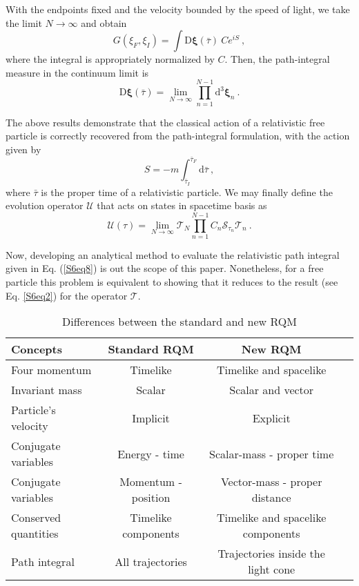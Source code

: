 \documentclass[12pt]{iopart}
\begin{document}
With the endpoints fixed and the velocity bounded by the speed of light, we take the limit 
$N\to\infty$ and obtain
%
    \begin{equation}
        G(\xi_F,\xi_I)=\int\mathrm{D}\boldsymbol{\xi}(\bar{\tau})\ Ce^{i S}\ ,
        \label{S6eq8}
    \end{equation}
%
where the integral is appropriately normalized by $C$.  Then, the path-integral measure 
in the continuum limit is
%
    \begin{equation}
        \mathrm{D}\boldsymbol{\xi}(\bar{\tau})=\lim_{N\to\infty}\prod_{n=1}^{N-1}
        \mathrm{d}^3\boldsymbol{\xi}_{n}\ .
        \label{S6eq9}
    \end{equation}
%

The above results demonstrate that the classical action of a relativistic free particle is correctly 
recovered from the path-integral formulation, with the action given by 
%
    \begin{equation}
        S=-m\int_{\bar{\tau}_I}^{\bar{\tau}_F}\mathrm{d}\bar{\tau}\ ,
        \label{S6eq10}
    \end{equation}
%
where $\bar{\tau}$ is the proper time of a relativistic particle.  We may finally define the 
evolution operator $\mathcal{U}$ that acts on states in spacetime basis as
%
    \begin{equation}
        \mathcal{U}(\tau)=\lim_{N\to\infty}\mathcal{T}_{N}\prod_{n=1}^{N-1}C_n\mathcal{S}_{\tau_n}
        \mathcal{T}_{n}\ .
        \label{S6eq11}
    \end{equation}
%

Now, developing an analytical method to evaluate the relativistic path integral given in Eq. 
(\ref{S6eq8}) is out the scope of this paper.  Nonetheless, for a free particle this problem 
is equivalent to showing that it reduces to the result (see Eq. \ref{S6eq2}) for the operator 
$\mathcal{T}$.
%


%
\begin{table}
\caption{Differences between the standard and new RQM}\label{tab1}
\centering
\begin{tabular}{| l | c | c | c }
\hline
\textbf{Concepts} & \textbf{Standard RQM}  & \textbf{New RQM}\\
\hline
Four momentum & Timelike & Timelike and spacelike\\
Invariant mass & Scalar & Scalar and vector\\
Particle's velocity& Implicit & Explicit\\
Conjugate variables & Energy - time & Scalar-mass - proper time\\
Conjugate variables & Momentum - position & Vector-mass - proper distance\\
Conserved quantities & Timelike components & Timelike and spacelike components\\
Path integral & All trajectories & Trajectories inside the light cone\\ 
\hline
\end{tabular}
\end{table}
%
\end{document}
